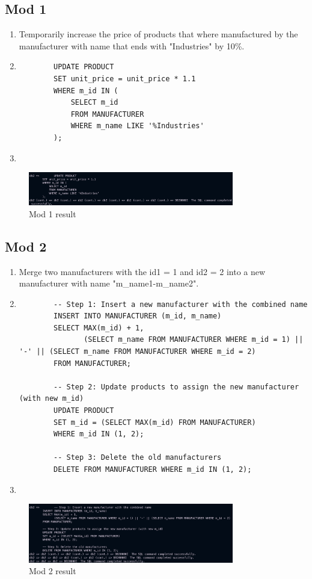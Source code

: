 \documentclass[a4paper,11pt]{article}
\begin{document}
\subsection*{Mod 1}
\begin{enumerate}[label=(\alph*)]
    \item Temporarily increase the price of products that where manufactured by the manufacturer with name that ends with "Industries" by 10\%.
    \item
        \begin{lstlisting}
        UPDATE PRODUCT
        SET unit_price = unit_price * 1.1
        WHERE m_id IN (
            SELECT m_id
            FROM MANUFACTURER
            WHERE m_name LIKE '%Industries'
        );
        \end{lstlisting}
    \item
\end{enumerate}
\begin{figure}[H]
    \centering
    \includegraphics[width=0.8\textwidth]{Mod1.png}
    \caption{Mod 1 result}
\end{figure}

\subsection*{Mod 2}
\begin{enumerate}[label=(\alph*)]
    \item Merge two manufacturers with the id1 = 1 and id2 = 2 into a new manufacturer with name "m\_name1-m\_name2".
    \item
        \begin{lstlisting}
        -- Step 1: Insert a new manufacturer with the combined name
        INSERT INTO MANUFACTURER (m_id, m_name)
        SELECT MAX(m_id) + 1,
               (SELECT m_name FROM MANUFACTURER WHERE m_id = 1) || '-' || (SELECT m_name FROM MANUFACTURER WHERE m_id = 2)
        FROM MANUFACTURER;

        -- Step 2: Update products to assign the new manufacturer (with new m_id)
        UPDATE PRODUCT
        SET m_id = (SELECT MAX(m_id) FROM MANUFACTURER)
        WHERE m_id IN (1, 2);

        -- Step 3: Delete the old manufacturers
        DELETE FROM MANUFACTURER WHERE m_id IN (1, 2);
        \end{lstlisting}

    \item
\end{enumerate}
\begin{figure}[H]
    \centering
    \includegraphics[width=0.8\textwidth]{Mod2.png}
    \caption{Mod 2 result}
\end{figure}
\end{document}

